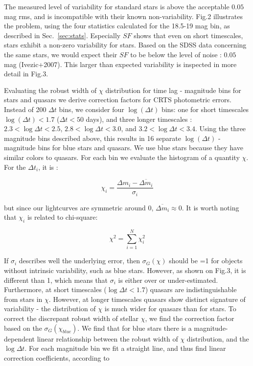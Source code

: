 \documentclass[fleqn,usenatbib]{mnras}  %
\begin{document}
The measured level of variability for standard stars is above the acceptable $0.05$ mag rms, and is incompatible with their known non-variability. Fig.2 illustrates the problem, using the four statistics calculated for the 18.5-19 mag bin, as described in Sec.~\ref{sec:stats}.  Especially $SF$ shows that even on short timescales, stars exhibit a non-zero variability for stars. Based on the SDSS data concerning the same stars, we would expect their $SF$ to be below the level of noise : $0.05$ mag (Ivezic+2007). This larger than expected variability is inspected in more detail in Fig.3. 


Evaluating the robust width of $\chi$ distribution for time lag - magnitude bins for stars and quasars we derive correction factors for CRTS photometric errors. Instead of 200 $\Delta t$ bins,  we consider four $\log (\Delta t ) $ bins: one for short timescales  $\log (\Delta t ) < 1.7$ ($\Delta t < 50$ days), and three longer timescales : $2.3<\log{\Delta t}<2.5$, $2.8<\log{\Delta t}<3.0$, and $3.2<\log{\Delta t}<3.4$. Using the three magnitude bins described above, this results in 16 separate $\log(\Delta t)$ - magnitude bins for blue stars and quasars. We use blue stars because they have similar colors to quasars. For each bin we evaluate the histogram of a quantity $\chi$. For the  $\Delta t_{i}$, it is :

\begin{equation}
\chi_{i} = \frac{\Delta m_{i} - \overline{\Delta m_{i}}}{\sigma_{i}}
\end{equation}

but since our lightcurves are symmetric around 0, $\overline{\Delta m_{i}} \approx 0$. 
It is worth noting that $\chi_{i}$ is related to chi-square: 

\begin{equation}
\chi^{2} = \sum_{i=1}^{N}{\chi_{i}^{2}}
\end{equation}

If $\sigma_{i}$ describes well the underlying error, then $\sigma_{G}(\chi)$ should be =1 for objects without intrinsic variability, such as blue stars. However, as shown on Fig.3, it is different than 1, which means that $\sigma_{i}$ is either over or under-estimated. Furthermore, at short timescales ($\log{\Delta t} < 1.7$) quasars are indistinguishable from stars in $\chi$. However, at longer timescales quasars show distinct signature of variability - the distribution of $\chi$ is much wider for quasars than for stars. To correct the discrepant robust width of stellar $\chi$, we find the correction factor based on the $\sigma_{G}(\chi_{blue})$.  We find that for blue stars there is a magnitude-dependent  linear relationship between the robust width of $\chi$ distribution, and the $\log{\Delta t}$. For each magnitude bin we fit a straight line, and thus find linear correction coefficients, according to 
\end{document}

